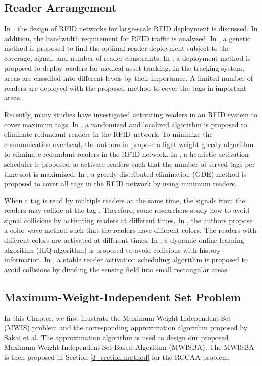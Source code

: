 \subsection{Reader Arrangement}


In \cite{4053360}, the design of RFID networks for large-scale RFID
deployment is discussed. In addition, the bandwidth requirement for
RFID traffic is analyzed. In \cite{fc2}, a genetic method is
proposed to find the optimal reader deployment subject to the
coverage, signal, and number of reader constraints. In
\cite{Oztekin2010100}, a deployment method is proposed to deploy
readers for medical-asset tracking. In the tracking system, areas
are classified into different levels by their importance. A limited
number of readers are deployed with the proposed method to cover the
tags in important areas.


Recently, many studies have investigated activating readers in an
RFID system to cover maximum tags. In \cite{cm2}, a randomized and
localized algorithm is proposed to eliminate redundant readers in
the RFID network. To minimize the communication overhead, the
authors in \cite{cm1} propose a light-weight greedy algorithm to
eliminate redundant readers in the RFID network. In \cite{6012852},
a heuristic activation scheduler is proposed to activate readers
such that the number of served tags per time-slot is maximized. In
\cite{related1}, a greedy distributed elimination (GDE) method is
proposed to cover all tags in the RFID network by using minimum
readers.


When a tag is read by multiple readers at the same time, the signals
from the readers may collide at the tag \cite{ts1,ts2}. Therefore,
some researchers study how to avoid signal collisions by activating
readers at different times. In \cite{ts1}, the authors propose a
color-wave method such that the readers have different colors. The
readers with different colors are activated at different times. In
\cite{ts2}, a dynamic online learning algorithm (HiQ algorithm) is
proposed to avoid collisions with history information. In
\cite{related2}, a stable reader activation scheduling algorithm is
proposed to avoid collisions by dividing the sensing field into
small rectangular areas.

\subsection{Maximum-Weight-Independent Set Problem} \label{b_mwis}

In this Chapter, we first illustrate the Maximum-Weight-Independent-Set (MWIS)
problem \cite{MWIS1,MWISP,MWIS2} and the corresponding approximation
algorithm proposed by Sakai et al. The approximation algorithm is used to
design our proposed Maximum-Weight-Independent-Set-Based Algorithm
(MWISBA). The MWISBA is then proposed in Section
\ref{3_section:method} for the RCCAA problem.

